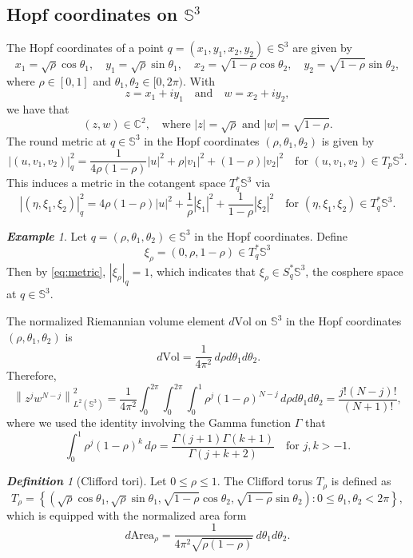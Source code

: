\documentclass[12pt,reqno]{amsart}
\newcommand\Area{\mathrm{Area}}
\newcommand\C{\mathbb{C}}
\newcommand\Sb{\mathbb{S}}
\newcommand\Vol{\mathrm{Vol}}
\theoremstyle{plain}
\theoremstyle{remark}
\newtheorem*{defn}{\textbf{Definition}}
\newtheorem*{ex}{\textbf{Example}}
\numberwithin{equation}{section}
\begin{document}
\subsection{Hopf coordinates on $\Sb^3$}\label{sec:H}
The Hopf coordinates of a point $q=(x_1,y_1,x_2,y_2)\in\Sb^3$ are given by
$$x_1=\sqrt\rho\cos\theta_1,\quad y_1=\sqrt\rho\sin\theta_1,\quad x_2=\sqrt{1-\rho}\cos\theta_2,\quad 
y_2=\sqrt{1-\rho}\sin\theta_2,$$
where $\rho\in[0,1]$ and $\theta_1,\theta_2\in[0,2\pi)$. With
$$z=x_1+iy_1\quad\text{and}\quad w=x_2+iy_2,$$
we have that
$$(z,w)\in\C^2,\quad\text{where }\left|z\right|=\sqrt\rho\text{ and }\left|w\right|=\sqrt{1-\rho}.$$
The round metric at $q\in\Sb^3$ in the Hopf coordinates $(\rho,\theta_1,\theta_2)$ is given by
$$\left|\left(u,v_1,v_2\right)\right|_q^2=\frac{1}{4\rho(1-\rho)}|u|^2+\rho\left|v_1\right|^2+(1-\rho)\left|v_2\right|^2\quad\text{for }\left(u,v_1,v_2\right)\in T_p\Sb^3.$$
This induces a metric in the cotangent space $T_q^*\Sb^3$ via
\begin{equation}\label{eq:metric}
\left|\left(\eta,\xi_1,\xi_2\right)\right|_q^2=4\rho(1-\rho)|u|^2+\frac1\rho\left|\xi_1\right|^2+\frac{1}{1-\rho}\left|\xi_2\right|^2\quad\text{for }\left(\eta,\xi_1,\xi_2\right)\in T_q^*\Sb^3.
\end{equation}
\begin{ex}
Let $q=(\rho,\theta_1,\theta_2)\in\Sb^3$ in the Hopf coordinates. Define 
\begin{equation}\label{eq:xirho}
\xi_\rho=(0,\rho,1-\rho)\in T_q^*\Sb^3
\end{equation} 
Then by \eqref{eq:metric}, $|\xi_\rho|_q=1$, which indicates that $\xi_\rho\in S^*_q\Sb^3$, the cosphere space at $q\in\Sb^3$.
\end{ex}

The normalized Riemannian volume element $d\Vol$ on $\Sb^3$ in the Hopf coordinates $(\rho,\theta_1,\theta_2)$ is 
$$\,d\Vol=\frac{1}{4\pi^2}\,d\rho d\theta_1d\theta_2.$$
Therefore,
\begin{equation}\label{eq:norm}
\left\|z^jw^{N-j}\right\|_{L^2(\Sb^3)}^2=\frac{1}{4\pi^2}\int_0^{2\pi}\int_0^{2\pi}\int_0^1\rho^j(1-\rho)^{N-j}\,d\rho d\theta_1d\theta_2=\frac{j!(N-j)!}{(N+1)!},
\end{equation}
where we used the identity involving the Gamma function $\Gamma$ that
\begin{equation}\label{eq:beta}
\int_0^1\rho^j(1-\rho)^k\,d\rho=\frac{\Gamma(j+1)\Gamma(k+1)}{\Gamma(j+k+2)}\quad\text{for }j,k>-1.
\end{equation}
\begin{defn}[Clifford tori]
Let $0\le\rho\le1$. The Clifford torus $T_\rho$ is defined as
$$T_\rho=\left\{\left(\sqrt\rho\cos\theta_1,\sqrt\rho\sin\theta_1,\sqrt{1-\rho}\cos\theta_2,\sqrt{1-\rho}\sin\theta_2\right):0\le\theta_1,\theta_2<2\pi\right\},$$
which is equipped with the normalized area form
$$d\Area_\rho=\frac{1}{4\pi^2\sqrt{\rho(1-\rho)}}\,d\theta_1d\theta_2.$$
\end{defn}
\end{document}
